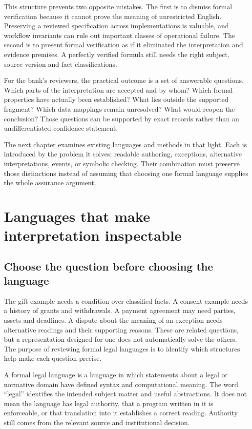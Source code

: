 \documentclass[12pt,a4paper,oneside,openany]{book}
\begin{document}
This structure prevents two opposite mistakes. The first is to dismiss formal
verification because it cannot prove the meaning of unrestricted English.
Preserving a reviewed specification across implementations is valuable, and
workflow invariants can rule out important classes of operational failure. The
second is to present formal verification as if it eliminated the interpretation
and evidence premises. A perfectly verified formula still needs the right
subject, source version and fact classifications.

For the bank's reviewers, the practical outcome is a set of answerable
questions. Which parts of the interpretation are accepted and by whom? Which
formal properties have actually been established? What lies outside the
supported fragment? Which data mappings remain unresolved? What would reopen
the conclusion? Those questions can be supported by exact records rather than
an undifferentiated confidence statement.

The next chapter examines existing languages and methods in that light. Each
is introduced by the problem it solves: readable authoring, exceptions,
alternative interpretations, events, or symbolic checking. Their combination
must preserve those distinctions instead of assuming that choosing one formal
language supplies the whole assurance argument.

\chapter{Languages that make interpretation inspectable}
\label{ch:languages}

\section{Choose the question before choosing the language}
\label{sec:languages-question}
The gift example needs a condition over classified facts. A consent example
needs a history of grants and withdrawals. A payment agreement may need parties,
assets and deadlines. A dispute about the meaning of an exception needs
alternative readings and their supporting reasons. These are related questions,
but a representation designed for one does not automatically solve the others.
The purpose of reviewing formal legal languages is to identify which structures
help make each question precise.

A formal legal language is a language in which statements about a legal or
normative domain have defined syntax and computational meaning. The word
``legal'' identifies the intended subject matter and useful abstractions. It
does not mean the language has legal authority, that a program written in it
is enforceable, or that translation into it establishes a correct reading.
Authority still comes from the relevant source and institutional decision.
\end{document}
